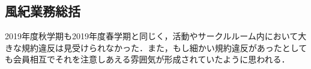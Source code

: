 \subsection*{風紀業務総括}

2019年度秋学期も2019年度春学期と同じく，活動やサークルルーム内において大きな規約違反は見受けられなかった．また，もし細かい規約違反があったとしても会員相互でそれを注意しあえる雰囲気が形成されていたように思われる．
